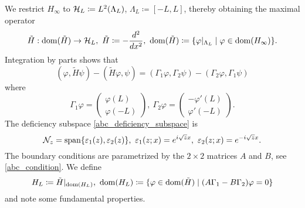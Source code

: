 We restrict $H_\infty$ to ${\mathcal H}_L\coloneqq L^2(\Lambda_L)$, $\Lambda_L\coloneqq[-L,L]$,
thereby obtaining the maximal operator 
\begin{equation}\label{H_maximal}
  \tilde H:\operatorname{dom}(\tilde H)\to{\mathcal H}_L,\ \tilde H\coloneqq -\frac{d^2}{dx^2},\
  \operatorname{dom}(\tilde H) \coloneqq \{\varphi|_{\Lambda_L} \mid \varphi\in\operatorname{dom}(H_\infty)\} . 
\end{equation}
Integration by parts shows that
\begin{equation*}
  (\varphi,\tilde H\psi) - (\tilde H\varphi,\psi)
  = (\Gamma_1\varphi,\Gamma_2\psi) - (\Gamma_2\varphi,\Gamma_1\psi)
\end{equation*}
where
\begin{equation*}
  \Gamma_1\varphi =
\begin{pmatrix}
  \varphi(L)\\
  \varphi(-L)
\end{pmatrix}
  ,\
  \Gamma_2\varphi =
\begin{pmatrix}
  -\varphi'(L)\\
  \varphi'(-L)
\end{pmatrix} .
\end{equation*}
The deficiency subspace \eqref{abc_deficiency_subspace} is
\begin{equation}\label{deficiency_subspace}
  \mathcal{N}_z = \operatorname{span}\{ \varepsilon_1(z),\varepsilon_2(z)\},\
  \varepsilon_1(z;x) = e^{i\sqrt{z}x},\ \varepsilon_2(z;x) = e^{-i\sqrt{z}x} .
\end{equation}
The boundary conditions are parametrized by the $2\times 2$ matrices $A$ and $B$, see \eqref{abc_condition}.
We define
\begin{equation}\label{H_L}
  H_L\coloneqq\tilde H|_{\operatorname{dom}(H_L)},\
  \operatorname{dom}(H_L) \coloneqq \{ \varphi\in\operatorname{dom}(\tilde H) \mid (A\Gamma_1-B\Gamma_2)\varphi =0 \}
\end{equation}
and note some fundamental properties.

